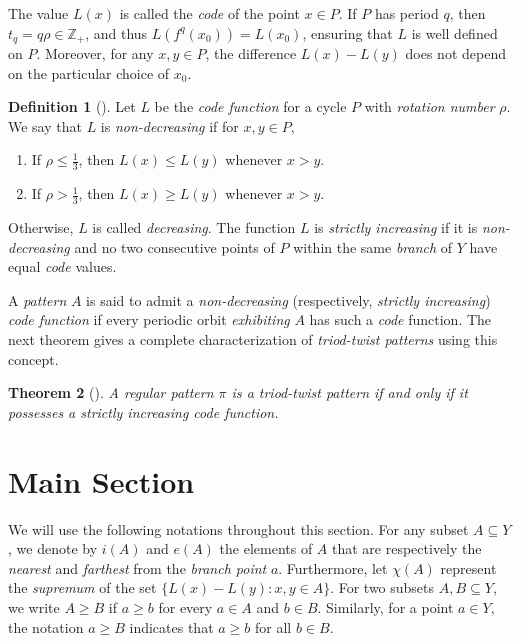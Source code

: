 \documentclass[12pt,reqno]{amsart}
\newtheorem{theorem}{Theorem}[section]
\theoremstyle{definition}
\newtheorem{definition}[theorem]{Definition}
\theoremstyle{remark}
\theoremstyle{assumption}
\numberwithin{equation}{section}
\begin{document}
The value $L(x)$ is called the \emph{code} of the point $x \in P$.  
If $P$ has period $q$, then $t_q = q\rho \in \mathbb{Z}_+$, and thus $L(f^q(x_0)) = L(x_0)$, ensuring that $L$ is well defined on $P$.  
Moreover, for any $x,y \in P$, the difference $L(x)-L(y)$ does not depend on the particular choice of $x_0$.

\begin{definition}[\cite{BB5}]\label{non:decreasing}
	Let $L$ be the \emph{code function} for a cycle $P$ with \emph{rotation number} $\rho$.  
	We say that $L$ is \emph{non-decreasing} if for $x, y \in P$, 
	\begin{enumerate}
		\item If $\rho \leqslant \tfrac{1}{3}$, then $L(x) \leqslant L(y)$ whenever $x > y$.
		\item If $\rho >  \tfrac{1}{3}$, then $L(x) \geqslant L(y)$ whenever $x >  y$.
	\end{enumerate}
	Otherwise, $L$ is called \emph{decreasing}.  
	The function $L$ is \emph{strictly increasing} if it is \emph{non-decreasing} and no two consecutive points of $P$ within the same \emph{branch} of $Y$ have equal \emph{code} values.
\end{definition}

A \emph{pattern} $A$ is said to admit a \emph{non-decreasing} (respectively, \emph{strictly increasing}) \emph{code function} if every periodic orbit \emph{exhibiting} $A$ has such a \emph{code} function.  
The next theorem gives a complete characterization of \emph{triod-twist patterns} using this concept.

\begin{theorem}[\cite{BB5}]\label{tri-od:rot:twist:order:inv}
	A regular pattern $\pi$ is a triod-twist pattern if and only if it possesses a strictly increasing code function.
\end{theorem}



\section{Main Section}\label{bound:phase:function}
We will use the following notations throughout this section. For any subset $A \subseteq Y$, we denote by $i(A)$ and $e(A)$ the elements of $A$ that are respectively the \emph{nearest} and \emph{farthest} from the \emph{branch point} $a$.  
Furthermore, let $\chi(A)$ represent the \emph{supremum} of the set $\{L(x) - L(y) : x, y \in A\}$.  
For two subsets $A, B \subseteq Y$, we write $A \geqslant B$ if $a \geqslant b$ for every $a \in A$ and $b \in B$.  
Similarly, for a point $a \in Y$, the notation $a \geqslant B$ indicates that $a \geqslant b$ for all $b \in B$.
\end{document}
